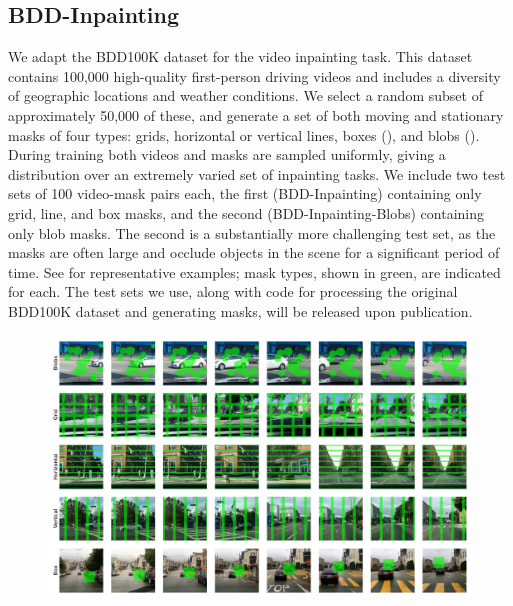 \subsection{BDD-Inpainting}
We adapt the BDD100K \citep{bdd100k} dataset for the video inpainting task. This dataset contains 100,000 high-quality first-person driving videos and includes a diversity of geographic locations and weather conditions. We select a random subset of approximately 50,000 
of these, and generate a set of both moving and stationary masks of four types: grids, horizontal or vertical lines, boxes (), and blobs (). During training both videos and masks are sampled uniformly, giving a distribution over an extremely varied set of inpainting tasks. We include two test sets of 100 video-mask pairs each, the first (BDD-Inpainting) containing only grid, line, and box masks, and the second (BDD-Inpainting-Blobs) containing only blob masks. The second is a substantially more challenging test set, as the masks are often large and occlude objects in the scene for a significant period of time. See  for representative examples; mask types, shown in green, are indicated for each. The test sets we use, along with code for processing the original BDD100K dataset and generating masks, will be released upon publication. 
\begin{figure}
    \begin{center}
        \centering
        \captionsetup{type=figure}
        \includegraphics[width=\linewidth]{figures/dataset-examples/bdd-examples.pdf}
        \label{fig:bdd-examples}
    \end{center}
    \end{figure}
